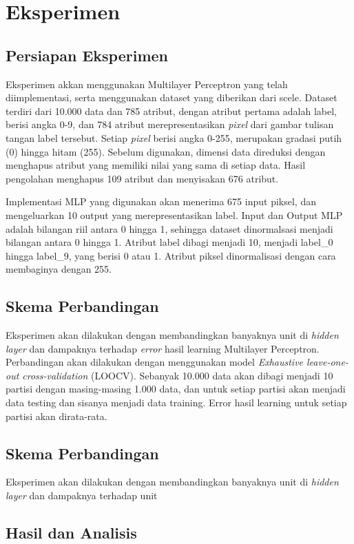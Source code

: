 \section{Eksperimen}

	\subsection{Persiapan Eksperimen}
	Eksperimen akkan menggunakan Multilayer Perceptron yang telah diimplementasi, serta menggunakan dataset yang diberikan dari scele. Dataset terdiri dari 10.000 data
	dan 785 atribut, dengan atribut pertama adalah label, berisi angka 0-9, dan 784 atribut merepresentasikan \textit{pixel} dari gambar tulisan tangan label tersebut.
	Setiap \textit{pixel} berisi angka 0-255, merupakan gradasi putih (0) hingga hitam (255). Sebelum digunakan, dimensi data direduksi dengan menghapus atribut yang 
	memiliki nilai yang sama di setiap data. Hasil pengolahan menghapus 109 atribut dan menyisakan 676 atribut. 

	Implementasi MLP yang digunakan akan menerima 675 input piksel, dan mengeluarkan 10 output yang merepresentasikan label. Input dan Output MLP adalah bilangan riil 
	antara 0 hingga 1, sehingga dataset dinormalsasi menjadi bilangan antara 0 hingga 1. Atribut label dibagi menjadi 10, menjadi label\_0 hingga label\_9, yang berisi
	0 atau 1. Atribut piksel dinormalisasi dengan cara membaginya dengan 255.

	\subsection{Skema Perbandingan}
	Eksperimen akan dilakukan dengan membandingkan banyaknya unit di \textit{hidden layer} dan dampaknya terhadap \textit{error} hasil learning Multilayer Perceptron. 
	Perbandingan akan dilakukan dengan menggunakan model \textit{Exhaustive leave-one-out cross-validation} (LOOCV). Sebanyak 10.000 data akan dibagi menjadi 10 partisi
	dengan masing-masing 1.000 data, dan untuk setiap partisi akan menjadi data testing dan sisanya menjadi data training. Error hasil learning untuk setiap partisi akan dirata-rata.

	\subsection{Skema Perbandingan}
	Eksperimen akan dilakukan dengan membandingkan banyaknya unit di \textit{hidden layer} dan dampaknya terhadap unit 

	\subsection{Hasil dan Analisis}
	\lipsum[1]